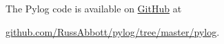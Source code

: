 


\largev
The Pylog code is available on \href{https://github.com/RussAbbott/pylog/tree/master/pylog}{GitHub} at

\href{https://github.com/RussAbbott/pylog/tree/master/pylog}{github.com/RussAbbott/pylog/tree/master/pylog}.

